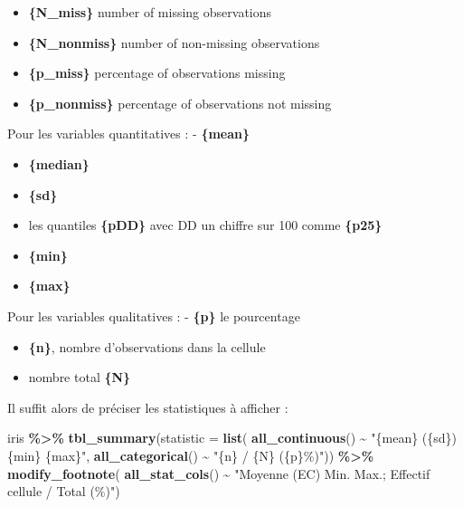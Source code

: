 \documentclass[
]{book}
\newenvironment{Shaded}{\begin{snugshade}}{\end{snugshade}}
\newcommand{\AttributeTok}[1]{\textcolor[rgb]{0.13,0.29,0.53}{#1}}
\newcommand{\FunctionTok}[1]{\textcolor[rgb]{0.13,0.29,0.53}{\textbf{#1}}}
\newcommand{\NormalTok}[1]{#1}
\newcommand{\SpecialCharTok}[1]{\textcolor[rgb]{0.81,0.36,0.00}{\textbf{#1}}}
\newcommand{\StringTok}[1]{\textcolor[rgb]{0.31,0.60,0.02}{#1}}
\begin{document}
\begin{itemize}
\item
  \textbf{\{N\_miss\}} number of missing observations
\item
  \textbf{\{N\_nonmiss\}} number of non-missing observations
\item
  \textbf{\{p\_miss\}} percentage of observations missing
\item
  \textbf{\{p\_nonmiss\}} percentage of observations not missing
\end{itemize}

Pour les variables quantitatives :
- \textbf{\{mean\}}

\begin{itemize}
\item
  \textbf{\{median\}}
\item
  \textbf{\{sd\}}
\item
  les quantiles \textbf{\{pDD\}} avec DD un chiffre sur 100 comme \textbf{\{p25\}}
\item
  \textbf{\{min\}}
\item
  \textbf{\{max\}}
\end{itemize}

Pour les variables qualitatives :
- \textbf{\{p\}} le pourcentage

\begin{itemize}
\item
  \textbf{\{n\}}, nombre d'observations dans la cellule
\item
  nombre total \textbf{\{N\}}
\end{itemize}

Il suffit alors de préciser les statistiques à afficher :

\begin{Shaded}
\begin{Highlighting}[]
\NormalTok{iris }\SpecialCharTok{\%\textgreater{}\%} \FunctionTok{tbl\_summary}\NormalTok{(}\AttributeTok{statistic =} \FunctionTok{list}\NormalTok{(}
  \FunctionTok{all\_continuous}\NormalTok{() }\SpecialCharTok{\textasciitilde{}} \StringTok{"\{mean\} (\{sd\}) \{min\} \{max\}"}\NormalTok{,}
  \FunctionTok{all\_categorical}\NormalTok{() }\SpecialCharTok{\textasciitilde{}} \StringTok{"\{n\} / \{N\} (\{p\}\%)"}\NormalTok{)) }\SpecialCharTok{\%\textgreater{}\%}
  \FunctionTok{modify\_footnote}\NormalTok{( }\FunctionTok{all\_stat\_cols}\NormalTok{() }\SpecialCharTok{\textasciitilde{}} \StringTok{"Moyenne (EC) Min. Max.; Effectif cellule / Total (\%)"}\NormalTok{)}
\end{Highlighting}
\end{Shaded}
\end{document}
